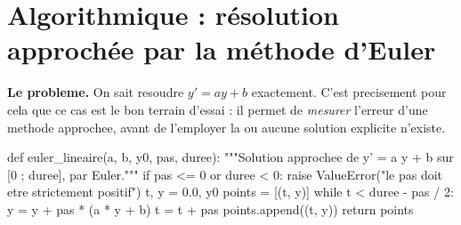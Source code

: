 
\section{Algorithmique : résolution approchée par la méthode d'Euler}



\textbf{Le probleme.} On sait resoudre $y' = ay + b$ exactement. C'est
precisement pour cela que ce cas est le bon terrain d'essai : il permet de
\emph{mesurer} l'erreur d'une methode approchee, avant de l'employer la ou
aucune solution explicite n'existe.


\begin{python}
def euler_lineaire(a, b, y0, pas, duree):
    """Solution approchee de y' = a y + b sur [0 ; duree], par Euler."""
    if pas <= 0 or duree < 0:
        raise ValueError("le pas doit etre strictement positif")
    t, y = 0.0, y0
    points = [(t, y)]
    while t < duree - pas / 2:
        y = y + pas * (a * y + b)
        t = t + pas
        points.append((t, y))
    return points
\end{python}

